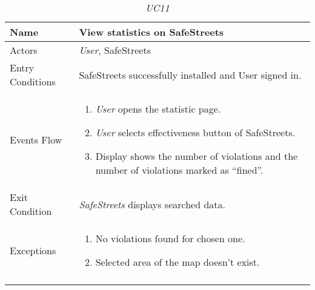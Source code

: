\documentclass[../../../RASD.tex]{subfiles}
\begin{document}
    \begin{center}
        \begin{longtable}{| p{.35\linewidth} | p{.65\linewidth} |}
            \hline
            \textbf{Name} & \textbf{View statistics on SafeStreets}\\ \hline
            Actors & \textit{User}, SafeStreets\\ \hline
            Entry Conditions & SafeStreets successfully installed and User signed in.\\ \hline
            Events Flow &
            \begin{enumerate}
                \item \textit{User} opens the statistic page.
                \item \textit{User} selects effectiveness button of SafeStreets.
                \item  Display shows the number of violations and the number of violations marked as “fined”.
            \end{enumerate}
            \\ \hline
            Exit Condition & \textit{SafeStreets} displays searched data.\\ \hline
            Exceptions &
            \begin{enumerate}
                \item No violations found for chosen one.
                \item Selected area of the map doesn’t exist.
            \end{enumerate}
            \\
            \hline
            \caption[\textit{Use Case 11}]{\textit{UC11}}
        \end{longtable}
    \end{center}
    \newpage
\end{document}
